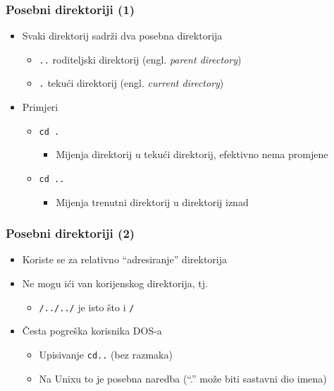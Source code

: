 \documentclass{beamer}
\begin{document}
\begin{frame}[t]
\frametitle{Posebni direktoriji (1)}
\begin{itemize}
  \item Svaki direktorij sadrži dva posebna direktorija
  \begin{itemize}
    \item \texttt{..} roditeljski direktorij (engl. \emph{parent directory})
    \item \texttt{.} tekući direktorij (engl. \emph{current directory})
  \end{itemize}
  \item Primjeri
  \begin{itemize}
    \item \texttt{cd . } 
    \begin{itemize}
      \item Mijenja direktorij u tekući direktorij, efektivno nema 
               promjene
    \end{itemize}
    \item \texttt{cd .. }
    \begin{itemize}
      \item Mijenja trenutni direktorij u direktorij iznad
    \end{itemize}
  \end{itemize}
\end{itemize}
\end{frame}

\begin{frame}[t]
\frametitle{Posebni direktoriji (2)}
\begin{itemize}
  \item Koriste se za relativno ``adresiranje'' direktorija
  \item Ne mogu ići van korijenskog direktorija, tj.
  \begin{itemize}
    \item[] \texttt{/../../} je isto što i \texttt{/}
  \end{itemize}
  \item Česta pogreška korisnika DOS-a
  \begin{itemize}
    \item Upisivanje \texttt{cd..} (bez razmaka)
    \item Na Unixu to je posebna naredba (``.'' može biti sastavni dio 
          imena)
  \end{itemize}
\end{itemize}
\end{frame}
\end{document}
